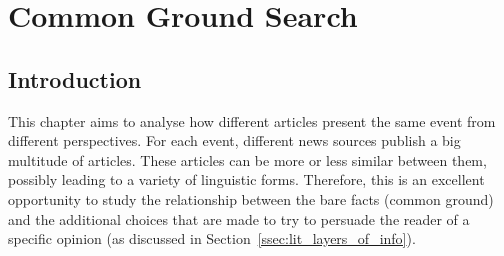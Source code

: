 \chapter{\statusgreen Common Ground Search}
\label{chap:common_ground_search}

\section{\statusgreen Introduction}


This chapter aims to analyse how different articles present the same event from different perspectives.
For each \gls{event}, different news sources publish a big multitude of articles.
These articles can be more or less similar between them, possibly leading to a variety of linguistic forms. %
Therefore, this is an excellent opportunity to study the relationship between the bare facts (common ground) and the additional choices that are made to try to persuade the reader of a specific opinion (as discussed in Section~\ref{ssec:lit_layers_of_info}). %

